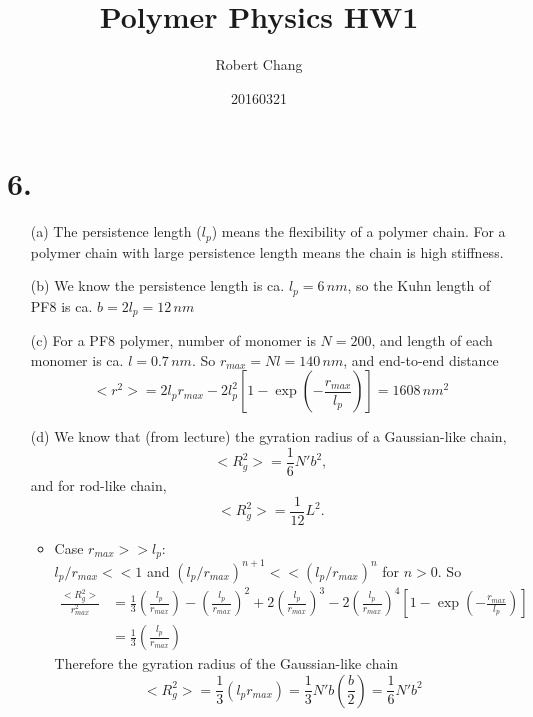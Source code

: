 \documentclass{article}
\title{Polymer Physics HW1}
\author{Robert Chang}
\date{20160321}
\begin{document}



\section*{6.} 
\begin{enumerate}
    \item[(a)] The persistence length ($l_p$) means the flexibility of a polymer chain. For a polymer chain with large persistence length means the chain is high stiffness.
    
    \item[(b)] We know the persistence length is ca. $l_p=6\,nm$, so the Kuhn length of PF8 is ca. $b=2l_p=12\,nm$
    
    \item[(c)] For a PF8 polymer, number of monomer is $N=200$, and length of each monomer is ca. $l=0.7\,nm$. So $r_{max} = Nl = 140\,nm$, and end-to-end distance 
    \[
    <r^2> = 2 l_p r_{max} - 2 l_p^2 \left[ 1- \exp \left(-\frac{r_{max}}{l_p} \right)\right] 
    = 1608\, nm^2
    \]
    \item[(d)] We know that (from lecture) the gyration radius of a Gaussian-like chain, 
    \[
    <R_g^2> = \frac{1}{6} N' b^2,
    \]
    and for rod-like chain,  
    \[
    <R_g^2> = \frac{1}{12} L^2.
    \]
    \begin{itemize}
        \item Case $r_{max} >> l_p$: \\
            $l_p / r_{max} << 1$ and $(l_p / r_{max} )^{n+1}<< (l_p / r_{max} )^{n}$ for  $n >0$.
            So             \[
                \begin{aligned}
                    \frac{ <R_g^2 >}{ r_{max}^2 } 
                    &= \frac{1}{3} \left( \frac{l_p}{r_{max}} \right)
                   -            \left( \frac{l_p}{r_{max}} \right)^2
                   +2           \left( \frac{l_p}{r_{max}} \right)^3
                   -2           \left( \frac{l_p}{r_{max}} \right)^4 \left[ 1-\exp\left( - \frac{r_{max}}{l_p} \right)  \right]\\
               &= \frac{1}{3} \left( \frac{l_p}{r_{max}} \right) 
                \end{aligned}
            \]
            Therefore the gyration radius of the Gaussian-like chain
            \[
                <R_g^2> = \frac{1}{3} ( l_p r_{max} )= \frac{1}{3} N'b \left( \frac{b}{2} \right) = \frac{1}{6} N' b^2
            \]


\end{itemize}
\end{enumerate}
\end{document}
